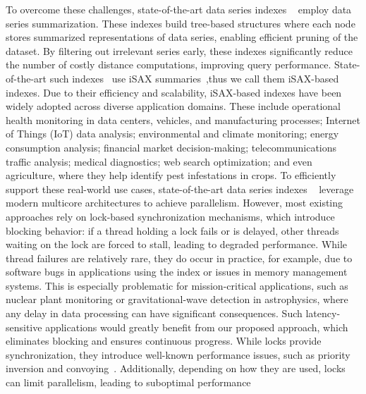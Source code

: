 \documentclass[a4paper,11pt,twoside,openany]{book}
\begin{document}
To overcome these challenges, state-of-the-art data series indexes
~\cite{DBLP:journals/pvldb/EchihabiZPB18,isax2plus,wang2013data,peng2018paris,parisplus,peng2020messi,PFP21-I,PFP21-II,hercules,dumpy}
employ data series summarization. These indexes build tree-based structures where each node 
stores summarized representations of data series, enabling efficient pruning of the dataset.
By filtering out irrelevant series early, these indexes significantly reduce the number of costly 
distance computations, improving query performance.
State-of-the-art such indexes~\cite{peng2020messi,parisplus,peng2021sing} 
use iSAX summaries~\cite{isax2plus,isaxfamily},thus we call them iSAX-based indexes.  
%
Due to their efficiency and scalability, iSAX-based indexes have been widely adopted across 
diverse application domains. These include operational health monitoring in data centers, 
vehicles, and manufacturing processes; Internet of Things (IoT) data analysis; environmental 
and climate monitoring; energy consumption analysis; financial market decision-making; 
telecommunications traffic analysis; medical diagnostics; web search optimization; 
and even agriculture, where they help identify pest infestations in crops.
%
To efficiently support these real-world use cases, state-of-the-art data series indexes
~\cite{DBLP:journals/pvldb/EchihabiZPB18,isaxfamily,peng2018paris,peng2020messi,PFP21-I,PFP21-II,hercules} 
leverage modern multicore architectures to achieve parallelism. However, most existing 
approaches rely on lock-based synchronization mechanisms, which introduce blocking behavior:
if a thread holding a lock fails or is delayed, other threads waiting on the lock are forced to stall,
leading to degraded performance.
While thread failures are relatively rare, they do occur in practice, for example, due to 
software bugs in applications using the index or issues in memory management systems. 
This is especially problematic for mission-critical applications, such as nuclear plant 
monitoring or gravitational-wave detection in astrophysics, where any delay in data processing 
can have significant consequences. Such latency-sensitive applications would greatly benefit
from our proposed approach, which eliminates blocking and ensures continuous progress.
%
While locks provide synchronization, they introduce well-known performance issues, 
such as priority inversion and convoying~\cite{F04}. Additionally, depending on how they
are used, locks can limit parallelism, leading to suboptimal performance
\end{document}

